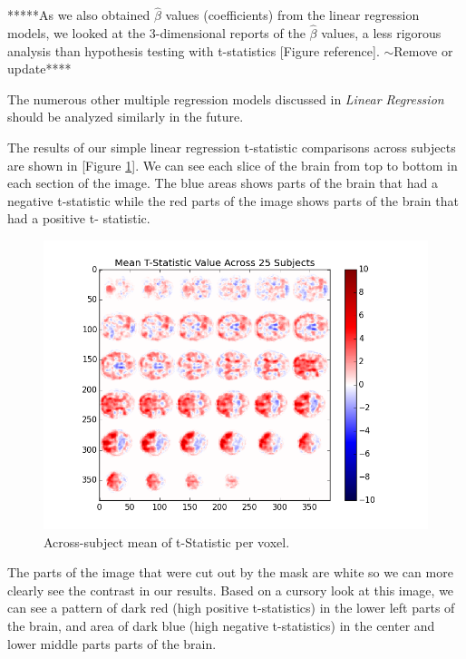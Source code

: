 
*****As we also obtained $\hat{\beta}$ values (coefficients) from the linear 
regression models, we looked at the 3-dimensional reports of the 
$\hat{\beta}$ values, a less rigorous analysis than hypothesis testing with 
t-statistics [Figure reference]. $\sim$Remove or update****



The numerous other multiple regression models discussed in 
\textit{Linear Regression} should be analyzed similarly in the future. 



\par \indent The results of our simple linear regression t-statistic 
comparisons across subjects are shown in [Figure \ref{fig:ht}]. We can see 
each slice of the brain from top to bottom in each section of the image. The 
blue areas shows parts of the brain that had a negative t-statistic while the 
red parts of the image shows parts of the brain that had a positive t-
statistic.

\begin{figure}[ht] \centering
\includegraphics[scale=0.5]{../images/hypothesis_testing} \caption{Across-subject 
mean of t-Statistic per voxel.} \label{fig:ht} \end{figure}

\par The parts of the image that were cut out by the mask are white so we can 
more clearly see the contrast in our results. Based on a cursory look at this 
image, we can see a pattern of dark red (high positive t-statistics) in the lower 
left parts of the brain, and area of dark blue (high negative t-statistics) in 
the center and lower middle parts parts of the brain.


